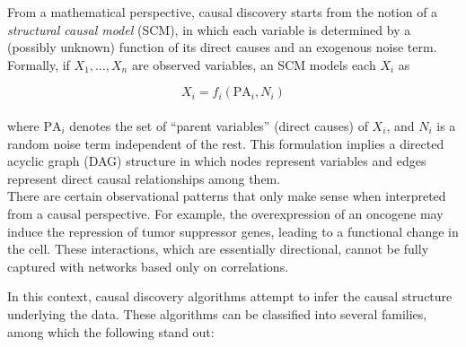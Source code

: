 \documentclass[12pt,a4paper]{report}
\begin{document}
From a mathematical perspective, causal discovery starts from the notion of a \textit{structural causal model} (SCM), in which each variable is determined by a (possibly unknown) function of its direct causes and an exogenous noise term. Formally, if \( X_1, \dots, X_n \) are observed variables, an SCM models each \( X_i \) as

\[
X_i = f_i(\text{PA}_i, N_i)
\]
\\
where \( \text{PA}_i \) denotes the set of “parent variables” (direct causes) of \( X_i \), and \( N_i \) is a random noise term independent of the rest. This formulation implies a directed acyclic graph (DAG) structure in which nodes represent variables and edges represent direct causal relationships among them.\\

There are certain observational patterns that only make sense when interpreted from a causal perspective. For example, the overexpression of an oncogene may induce the repression of tumor suppressor genes, leading to a functional change in the cell. These interactions, which are essentially directional, cannot be fully captured with networks based only on correlations.

In this context, causal discovery algorithms attempt to infer the causal structure underlying the data. These algorithms can be classified into several families, among which the following stand out:
\end{document}
